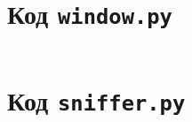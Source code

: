 \documentclass[bachelor, och, coursework]{SCWorks}
\begin{document}



\appendix

    \section{Код \texttt{window.py}}
    \inputminted{python3}{code/sniffer/window.py}

    \section{Код \texttt{sniffer.py}}
    \inputminted{python3}{code/sniffer/sniffer.py}
\end{document}
